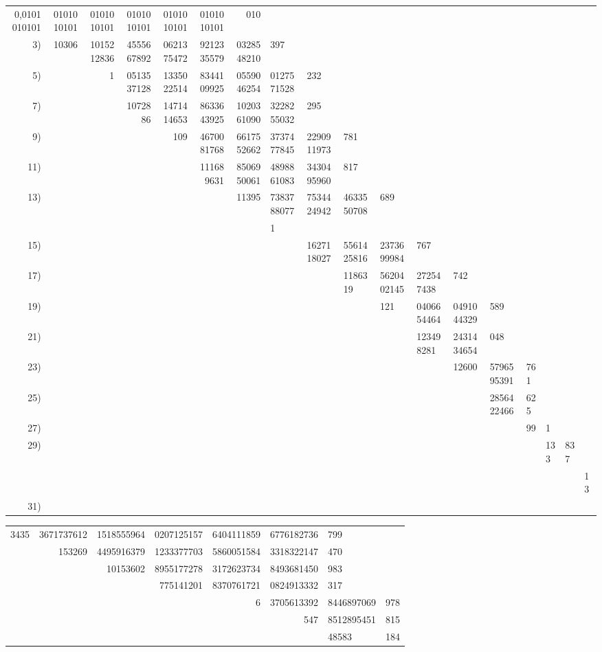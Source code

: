 \documentclass[10pt,a4paper]{article}
\begin{document}
\begin{center}
\begin{tabular}{r r r r r r r}
0,0101010101 & 0101010101 & 0101010101 & 0101010101 & 0101010101 & 0101010101 & 010 \\
3) & 10306 & 1015212836 & 4555667892 & 0621375472 & 9212335579 & 0328548210 & 397 \\
5) & & 1 & 0513537128 & 1335022514 & 8344109925 & 0559046254 & 0127571528 & 232 \\
7) & & & 1072886 & 1471414653 & 8633643925 & 1020361090 & 3228255032 & 295 \\
9) & & & & 109 & 4670081768 & 6617552662 & 3737477845 & 2290911973 & 781 \\
11) & & & & & 111689631 & 8506950061 & 4898861083 & 3430495960 & 817 \\
13) & & & & & & 11395 & 7383788077 & 7534424942 & 4633550708 & 689 \\
& & & & & & & 1 & & & & \\
15) & & & & & & & & 1627118027 & 5561425816 & 2373699984 & 767 \\
17) & & & & & & & & & 1186319 & 5620402145 & 272547438 & 742 \\
19) & & & & & & & & & & 121 & 0406654464 & 0491044329 & 589 \\
21) & & & & & & & & & & & 123498281 & 2431434654 & 048 \\
23) & & & & & & & & & & & & 12600 & 5796595391 & 761 \\
25) & & & & & & & & & & & & & 2856422466 & 625 \\
27) & & & & & & & & & & & & & & 99 & 1 \\
29) & & & & & & & & & & & & & & & 133 & 837 \\
& & & & & & & & & & & & & & & & & 13 \\
31) & & & & & & & & & & & & & & & & & \\
\end{tabular}
\end{center}

\medskip

\begin{center}
\begin{tabular}{r r r r r r}
3435 & 3671737612 & 1518555964 & 0207125157 & 6404111859 & 6776182736 & 799 \\
& 153269 & 4495916379 & 1233377703 & 5860051584 & 3318322147 & 470 \\
& & 10153602 & 8955177278 & 3172623734 & 8493681450 & 983 \\
& & & 775141201 & 8370761721 & 0824913332 & 317 \\
& & & & 6 & 3705613392 & 8446897069 & 978 \\
& & & & & 547 & 8512895451 & 815 \\
& & & & & & 48583 & 184 \\
\end{tabular}
\end{center}
\end{document}
